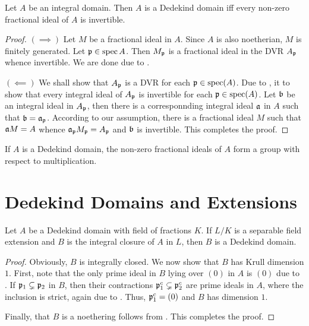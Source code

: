 \begin{proposition}
    Let $A$ be an integral domain. Then $A$ is a Dedekind domain iff every non-zero fractional ideal of $A$ is invertible.
\end{proposition}
\begin{proof}
    $(\implies)$ Let $M$ be a fractional ideal in $A$. Since $A$ is also noetherian, $M$ is finitely generated. Let $\mathfrak p\in\operatorname{spec} A$. Then $M_\mathfrak p$ is a fractional ideal in the DVR $A_\mathfrak p$ whence invertible. We are done due to .

    $(\impliedby)$ We shall show that $A_\mathfrak p$ is a DVR for each $\mathfrak p\in\operatorname{spec}(A)$. Due to , it to show that every integral ideal of $A_\mathfrak p$ is invertible for each $\mathfrak p\in\operatorname{spec}(A)$. Let $\mathfrak b$ be an integral ideal in $A_\mathfrak p$, then there is a corresponnding integral ideal $\mathfrak a$ in $A$ such that $\mathfrak b = \mathfrak a_\mathfrak p$. According to our assumption, there is a fractional ideal $M$ such that $\mathfrak a M = A$ whence $\mathfrak a_\mathfrak p M_\mathfrak p = A_\mathfrak p$ and $\mathfrak b$ is invertible. This completes the proof.
\end{proof}

\begin{corollary}
    If $A$ is a Dedekind domain, the non-zero fractional ideals of $A$ form a group with respect to multiplication. 
\end{corollary}

\section{Dedekind Domains and Extensions}

\begin{theorem}
    Let $A$ be a Dedekind domain with field of fractions $K$. If $L/K$ is a separable field extension and $B$ is the integral closure of $A$ in $L$, then $B$ is a Dedekind domain.
\end{theorem}
\begin{proof}
    Obviously, $B$ is integrally closed. We now show that $B$ has Krull dimension $1$. First, note that the only prime ideal in $B$ lying over $(0)$ in $A$ is $(0)$ due to . If $\mathfrak p_1\subsetneq\mathfrak p_2$ in $B$, then their contractions $\mathfrak p_1^c\subsetneq\mathfrak p_2^c$ are prime ideals in $A$, where the inclusion is strict, again due to . Thus, $\mathfrak p_1^c = (0)$ and $B$ has dimension $1$.

    Finally, that $B$ is a noethering follows from . This completes the proof.
\end{proof}

